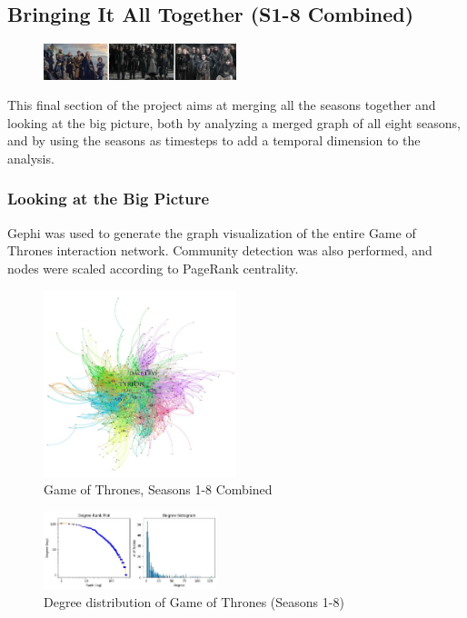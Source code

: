 \documentclass[10pt,twocolumn,letterpaper]{article}
\begin{document}
\newpage

\subsection{Bringing It All Together (S1-8 Combined)}

\begin{figure}[!h]
    \centering
    \includegraphics[width=0.5\textwidth]{img/all_seasons/group_frames.jpg}
\end{figure}

This final section of the project aims at merging all the seasons together and looking at the big picture, both by analyzing a merged graph of all eight seasons, and by using the seasons as timesteps to add a temporal dimension to the analysis.

\subsubsection{Looking at the Big Picture}

Gephi was used to generate the graph visualization of the entire Game of Thrones interaction network. Community detection was also performed, and nodes were scaled according to PageRank centrality.

\begin{figure}[!h]
    \centering
    \includegraphics[width=0.5\textwidth]{img/all_seasons/gephi_all_seasons_graph.png}
    \caption{\small{Game of Thrones, Seasons 1-8 Combined}}
    \label{fig:gephi_all_seasons}
\end{figure}

\begin{figure}[!h]
    \centering
    \includegraphics[width=0.45\textwidth]{img/all_seasons/degree_plot.jpg}
    \caption{\small{Degree distribution of Game of Thrones (Seasons 1-8)}}
\end{figure}
\end{document}
